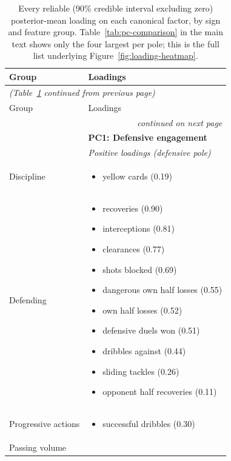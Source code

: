 \begin{longtable}{p{2.6cm}p{13cm}}
\caption{Every reliable (90\% credible interval excluding zero) posterior-mean loading on each canonical
factor, by sign and feature group. Table~\ref{tab:pc-comparison} in the main text shows only the four
largest per pole; this is the full list underlying Figure~\ref{fig:loading-heatmap}.}
\label{tab:full-loadings}\\
\toprule
Group & Loadings \\
\midrule
\endfirsthead
\multicolumn{2}{l}{\small\itshape (Table~\ref{tab:full-loadings} continued from previous page)}\\
\toprule
Group & Loadings \\
\midrule
\endhead
\midrule
\multicolumn{2}{r}{\small\itshape continued on next page}\\
\endfoot
\bottomrule
\endlastfoot
 & \rule{0pt}{2.2ex}\textbf{PC1: Defensive engagement}\\
 & \textit{Positive loadings (defensive pole)}\\
Discipline & \begin{itemize}[nosep,leftmargin=1.1em,topsep=1pt]
    \item yellow cards (0.19)
  \end{itemize}\\
Defending & \begin{itemize}[nosep,leftmargin=1.1em,topsep=1pt]
    \item recoveries (0.90)
    \item interceptions (0.81)
    \item clearances (0.77)
    \item shots blocked (0.69)
    \item dangerous own half losses (0.55)
    \item own half losses (0.52)
    \item defensive duels won (0.51)
    \item dribbles against (0.44)
    \item sliding tackles (0.26)
    \item opponent half recoveries (0.11)
  \end{itemize}\\
Progressive actions & \begin{itemize}[nosep,leftmargin=1.1em,topsep=1pt]
    \item successful dribbles (0.30)
  \end{itemize}\\
Passing volume & \begin{itemize}[nosep,leftmargin=1.1em,topsep=1pt]

\end{itemize}
\end{longtable}
